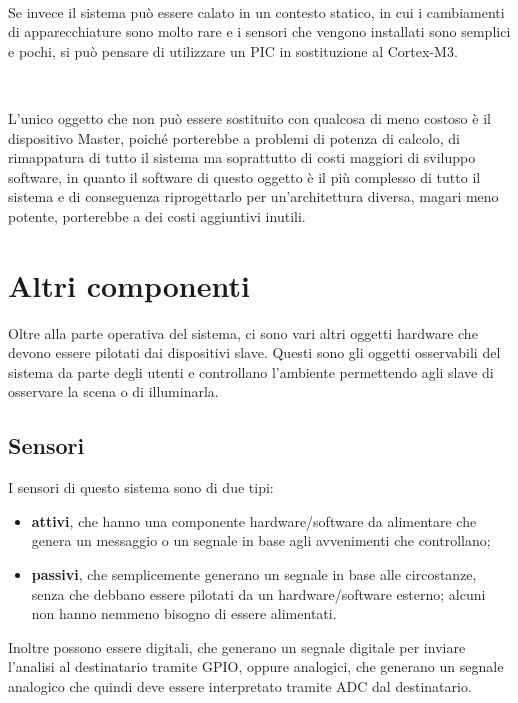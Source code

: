 \documentclass[a4paper,titlepage]{book}
\newcommand{\itema}{\begin{itemize}[noitemsep,topsep=10pt,parsep=23pt,partopsep=0pt]}
\begin{document}
~

Se invece il sistema può essere calato in un contesto statico, in cui i cambiamenti di apparecchiature sono molto rare e i sensori che vengono installati sono semplici e pochi, si può pensare di utilizzare un PIC in sostituzione al Cortex-M3.

~

L'unico oggetto che non può essere sostituito con qualcosa di meno costoso è il dispositivo Master, poiché porterebbe a problemi di potenza di calcolo, di rimappatura di tutto il sistema ma soprattutto di costi maggiori di sviluppo software, in quanto il software di questo oggetto è il più complesso di tutto il sistema e di conseguenza riprogettarlo per un'architettura diversa, magari meno potente, porterebbe a dei costi aggiuntivi inutili. 



\section{Altri componenti}

Oltre alla parte operativa del sistema, ci sono vari altri oggetti hardware che devono essere pilotati dai dispositivi slave. Questi sono gli oggetti osservabili del sistema da parte degli utenti e controllano l'ambiente permettendo agli slave di osservare la scena o di illuminarla.

\subsection{Sensori}

I sensori di questo sistema sono di due tipi:

\itema

\item \textbf{attivi}, che hanno una componente hardware/software da alimentare che genera un messaggio o un segnale in base agli avvenimenti che controllano;

\item \textbf{passivi}, che semplicemente generano un segnale in base alle circostanze, senza che debbano essere pilotati da un hardware/software esterno; alcuni non hanno nemmeno bisogno di essere alimentati.

\end{itemize}  

Inoltre possono essere digitali, che generano un segnale digitale per inviare l'analisi al destinatario tramite GPIO, oppure analogici, che generano un segnale analogico che quindi deve essere interpretato tramite ADC dal destinatario.
\end{document}
